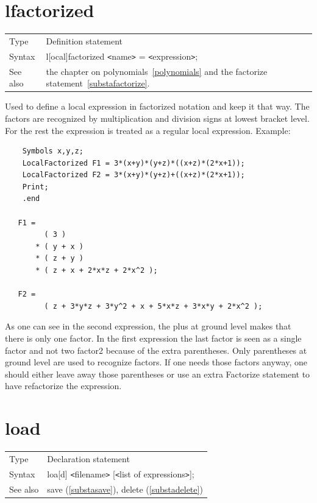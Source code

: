 
\section{lfactorized}
\label{substalfactorized}

\noindent \begin{tabular}{ll}
Type & Definition statement\\
Syntax & l[ocal]factorized {\tt<}name{\tt>} = {\tt<}expression{\tt>};
\\ See also & the chapter on polynomials~\ref{polynomials} and the 
factorize statement~\ref{substafactorize}.
\end{tabular} \vspace{4mm}

\noindent Used to define a local expression in factorized 
notation and keep it that way. The factors are recognized by multiplication 
and division signs at lowest bracket level. For the rest the expression is 
treated as a regular local expression. Example:
\begin{verbatim}
    Symbols x,y,z;
    LocalFactorized F1 = 3*(x+y)*(y+z)*((x+z)*(2*x+1));
    LocalFactorized F2 = 3*(x+y)*(y+z)+((x+z)*(2*x+1));
    Print;
    .end

   F1 =
         ( 3 )
       * ( y + x )
       * ( z + y )
       * ( z + x + 2*x*z + 2*x^2 );

   F2 =
         ( z + 3*y*z + 3*y^2 + x + 5*x*z + 3*x*y + 2*x^2 );
\end{verbatim}
\noindent As one can see in the second expression, the plus at ground level 
makes that there is only one factor. In the first expression the last 
factor is seen as a single factor and not two factor2 because of the extra 
parentheses. Only parentheses at ground level are used to recognize 
factors. If one needs those factors anyway, one should either leave away 
those parentheses or use an extra Factorize statement to have \FORM{} 
refactorize the expression.
\vspace{10mm}


\section{load}
\label{substaload}

\noindent \begin{tabular}{ll}
Type & Declaration statement\\
Syntax & loa[d] {\tt<}filename{\tt>} [{\tt<}list of expressions{\tt>}];
\\ See also & save (\ref{substasave}), delete (\ref{substadelete})
\end{tabular} \vspace{4mm}

